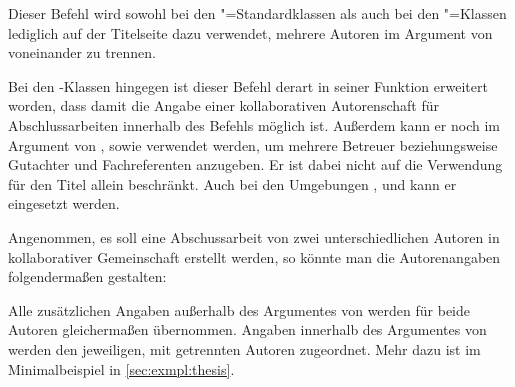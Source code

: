 \begin{Declaration}{}
\printdeclarationlist%
%
%
Dieser Befehl wird sowohl bei den "=Standardklassen als auch bei 
den \KOMAScript"=Klassen lediglich auf der Titelseite dazu verwendet, mehrere 
Autoren im Argument von  voneinander zu trennen.

Bei den \TUDScript-Klassen hingegen ist dieser Befehl derart in seiner Funktion 
erweitert worden, dass damit die Angabe einer kollaborativen Autorenschaft für 
Abschlussarbeiten innerhalb des Befehls  möglich ist. Außerdem 
kann er noch im Argument von ,  sowie 
 verwendet werden, um mehrere Betreuer beziehungsweise Gutachter 
und Fachreferenten anzugeben. Er ist dabei nicht auf die Verwendung für den 
Titel allein beschränkt. Auch bei den Umgebungen , 
 und  kann er eingesetzt werden.
\end{Declaration}
%
\begin{Example}
Angenommen, es soll eine Abschussarbeit von zwei unterschiedlichen Autoren in 
kollaborativer Gemeinschaft erstellt werden, so könnte man die Autorenangaben 
folgendermaßen gestalten:
\begin{Code}
\author{%
  Mickey Mouse
\and%
  Donald Duck
}
\end{Code}
Alle zusätzlichen Angaben außerhalb des Argumentes von  werden 
für beide Autoren gleichermaßen übernommen. Angaben innerhalb des Argumentes 
von  werden den jeweiligen, mit  getrennten Autoren 
zugeordnet. Mehr dazu ist im Minimalbeispiel in \autoref{sec:exmpl:thesis}.
\end{Example}

